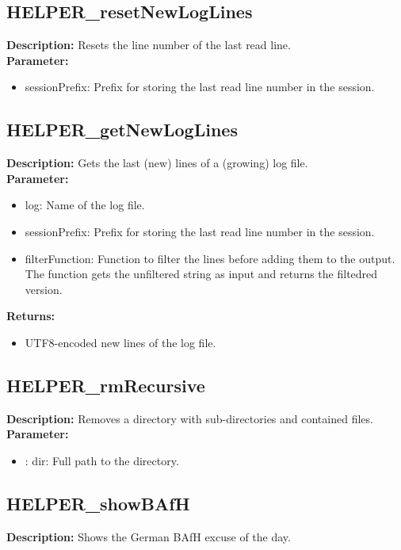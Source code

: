 \subsection{HELPER\_resetNewLogLines}
\textbf{Description:} Resets the line number of the last read line.\\
\textbf{Parameter:}
\begin{itemize}
\item sessionPrefix: Prefix for storing the last read line number in the session.
\end{itemize}

\subsection{HELPER\_getNewLogLines}
\textbf{Description:} Gets the last (new) lines of a (growing) log file.\\
\textbf{Parameter:}
\begin{itemize}
\item log: Name of the log file.
\item sessionPrefix: Prefix for storing the last read line number in the session.
\item filterFunction: Function to filter the lines before adding them to the output. The function gets the unfiltered string as input and returns the filtedred version.
\end{itemize}
\textbf{Returns:}
\begin{itemize}
\item UTF8-encoded new lines of the log file.
\end{itemize}

\subsection{HELPER\_rmRecursive}
\textbf{Description:} Removes a directory with sub-directories and contained files.\\
\textbf{Parameter:}
\begin{itemize}
\item : dir: Full path to the directory.
\end{itemize}

\subsection{HELPER\_showBAfH}
\textbf{Description:} Shows the German BAfH excuse of the day.\\

